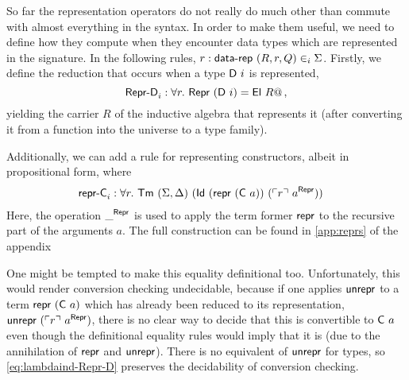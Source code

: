 So far the representation operators do not really do much other than commute
with almost everything in the syntax. In order to make
them useful, we need to define how they compute when they encounter data types
which are represented in the signature.
In the following rules, $r : \textsf{data-rep}\ (R, r, Q) \in_i \Sigma$.
Firstly, we define the reduction that occurs when a type $\textsf{D}\ i$ is represented,
\begin{equation}
  \textsf{Repr-D}_i : \forall r.\ \textsf{Repr}\ (\textsf{D}\ i) = \textsf{El}\ R@ \,, \label{eq:lambdaind-Repr-D}
\end{equation}
yielding the carrier $R$ of the inductive algebra that represents it (after
converting it from a function into the universe to a type family).

Additionally, we can add a rule for representing constructors, albeit in propositional form, where
\begin{align*}
&\mta{repr-C}_i : \forall r.\ \Tm\ (\Sigma, \Delta)\ (\mta{Id}\ (\Mrepr\ (\mta{C}\ a))\ (\emb{r}\ a^\mta{Repr}))
\end{align*}
Here, the operation $\_^{\textsf{Repr}}$ is used to apply the term former
$\textsf{repr}$ to the recursive part of the arguments $a$. The full construction
can be found in \cref{app:reprs} of the appendix

One might be tempted to make this equality definitional too. Unfortunately, this
would render conversion checking undecidable, because if one applies
$\textsf{unrepr}$ to a term $\textsf{repr}\ (\textsf{C}\ a)$ which has already been reduced
to its representation, $\textsf{unrepr}\ (\ulcorner r \urcorner\ a^{\textsf{Repr}})$, there is no
clear way to decide that this is convertible to $\textsf{C}\ a$ even though the
definitional equality rules would imply that it is (due
to the annihilation of $\textsf{repr}$ and $\textsf{unrepr}$). There is no
equivalent of $\textsf{unrepr}$ for types, so \eqref{eq:lambdaind-Repr-D} preserves
the decidability of conversion checking.


